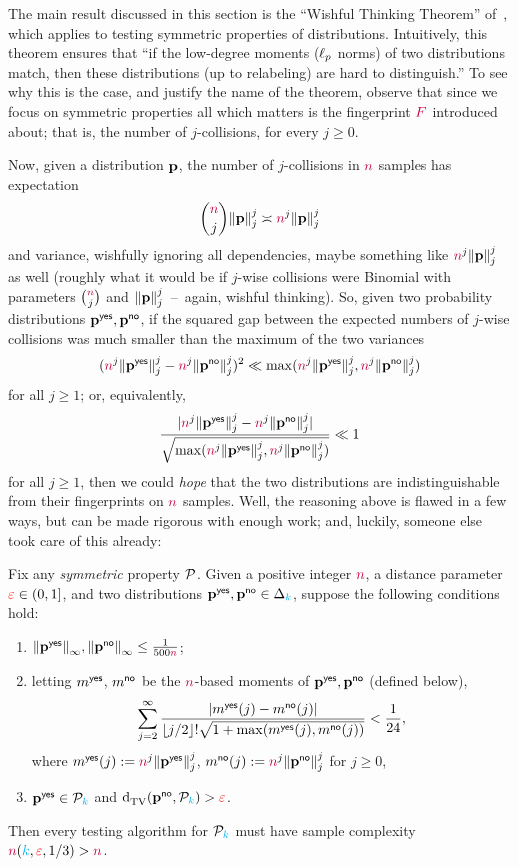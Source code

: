 The main result discussed in this section is the ``Wishful Thinking Theorem'' of~\citet{Valiant:11}, which applies to testing symmetric properties of distributions. Intuitively, this theorem ensures that ``if the low-degree moments ($\lp[p]$ norms) of two distributions match, then these distributions (up to relabeling) are hard to distinguish.'' To see why this is the case, and justify the name of the theorem, observe that since we focus on symmetric properties all which matters is the fingerprint $\freq$ introduced about; that is, the number of $j$-collisions, for every $j\geq 0$.

Now, given a distribution $\p$, the number of $j$-collisions in $\ns$ samples has expectation 
\[
	\binom{\ns}{j}\norm{\p}_j^j \asymp \ns^j\norm{\p}_j^j
\]
and variance, wishfully ignoring all dependencies, maybe something like $\ns^j\norm{\p}_j^j$ as well (roughly what it would be if $j$-wise collisions were Binomial with parameters $\binom{\ns}{j}$ and $\norm{\p}_j^j$~--~again, wishful thinking). So, given two probability distributions $\p^\yes,\p^\no$, if the squared gap between the expected numbers of $j$-wise collisions was much smaller than the maximum of the two variances
\[
		(\ns^j\norm{\p^\yes}_j^j - \ns^j\norm{\p^\no}_j^j )^2 \ll
		\max(\ns^j\norm{\p^\yes}_j^j, \ns^j\norm{\p^\no}_j^j)
\]
for all $j\geq 1$; or, equivalently, 
\[
	\frac{|\ns^j\norm{\p^\yes}_j^j - \ns^j\norm{\p^\no}_j^j|}{\sqrt{\max(\ns^j\norm{\p^\yes}_j^j, \ns^j\norm{\p^\no}_j^j)}} \ll 1
\] 
for all $j\geq 1$, then we could \emph{hope} that the two distributions are indistinguishable from their fingerprints on $\ns$ samples. Well, the reasoning above is flawed in a few ways, but can be made rigorous with enough work; and, luckily, someone else took care of this already:
\begin{theorem}\label{theo:valiant:wishful}
  Fix any \emph{symmetric} property $\property$. Given a positive integer $\ns$, a distance parameter $\dst\in(0,1]$, and two distributions $\p^\yes,\p^\no\in\distribs{\ab}$, suppose the following conditions hold:
  \begin{enumerate}
    \item $\norminf{\p^\yes},\norminf{\p^\no} \leq \frac{1}{500\ns}$;
    \item letting $m^\yes$, $m^\no$ be the $\ns$-based moments of $\p^\yes,\p^\no$ (defined below),
      \[
         \sum_{j=2}^\infty \frac{\abs{m^{\yes}(j)-m^{\no}(j)}}{\flr{j/2}!\sqrt{1+\max(m^{\yes}(j),m^{\no}(j))}} < \frac{1}{24},
      \]
      where $m^{\yes}(j) \eqdef \ns^j\norm{\p^\yes}_j^j$, $m^{\no}(j) \eqdef \ns^j\norm{\p^\no}_j^j$ for $j\geq 0$,
     \item $\p^\yes\in\property_\ab$ and $\totalvardist{\p^\no}{\property_\ab}>\dst$.
  \end{enumerate}
  Then every testing algorithm for $\property_\ab$ must have sample complexity $\ns(\ab,\dst, 1/3) > \ns$.
\end{theorem}
